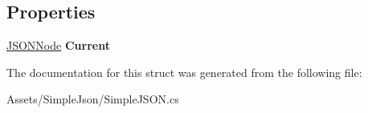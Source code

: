 \subsection*{Properties}
\begin{DoxyCompactItemize}
\item 
\hyperlink{classSimpleJSON_1_1JSONNode}{J\+S\+O\+N\+Node} {\bfseries Current}\hypertarget{structSimpleJSON_1_1JSONNode_1_1ValueEnumerator_a25e382909b4b8fc6c48d42b5ac220b02}{}\label{structSimpleJSON_1_1JSONNode_1_1ValueEnumerator_a25e382909b4b8fc6c48d42b5ac220b02}

\end{DoxyCompactItemize}


The documentation for this struct was generated from the following file\+:\begin{DoxyCompactItemize}
\item 
Assets/\+Simple\+Json/Simple\+J\+S\+O\+N.\+cs\end{DoxyCompactItemize}
